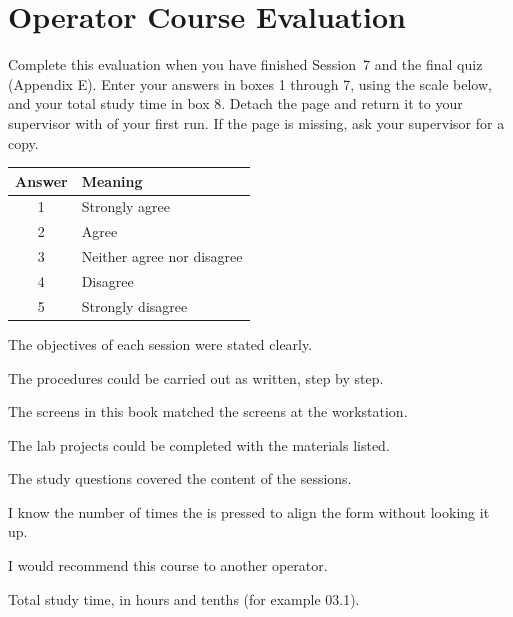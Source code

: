 \chapter{Operator Course Evaluation}

Complete this evaluation when you have finished Session~7 and the final quiz
(Appendix E).  Enter your answers in boxes 1 through 7, using the scale
below, and your total study time in box 8.  Detach the page and return it to
your supervisor with  of your first run.  If the page is missing, ask
your supervisor for a copy.

\begin{center}\small
\begin{tabular}{@{}cl@{}}
\rule{0pt}{10pt}\sffamily\bfseries Answer & \sffamily\bfseries Meaning\\\hline
1 & Strongly agree\\
2 & Agree\\
3 & Neither agree nor disagree\\
4 & Disagree\\
5 & Strongly disagree\\\hline
\end{tabular}\end{center}

\newcommand\EvalBox[2]{\par\addvspace{6pt}\noindent\makebox[8mm][l]{\sffamily\bfseries #1}%
  \parbox[t]{\dimexpr\linewidth-30mm\relax}{\RaggedRight #2}\hfill
  \framebox[10mm]{\rule{0pt}{5mm}}\par}
\EvalBox{1}{The objectives of each session were stated clearly.}
\EvalBox{2}{The procedures could be carried out as written, step by step.}
\EvalBox{3}{The screens in this book matched the screens at the workstation.}
\EvalBox{4}{The lab projects could be completed with the materials listed.}
\EvalBox{5}{The study questions covered the content of the sessions.}
\EvalBox{6}{I know the number of times the  is pressed to align
  the form without looking it up.}
\EvalBox{7}{I would recommend this course to another operator.}
\EvalBox{8}{Total study time, in hours and tenths (for example 03.1).}

\vspace{12pt}
\quad{}\par\vspace{8pt}
\quad{}\par
